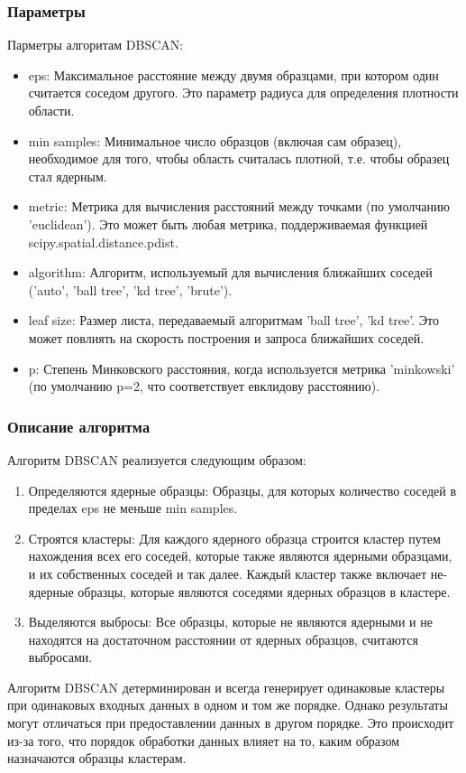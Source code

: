 		\subsubsection{Параметры}
			Парметры алгоритам DBSCAN:
			\begin{itemize}
				\item eps: Максимальное расстояние между двумя образцами, при котором один считается соседом другого. Это параметр радиуса для определения плотности области.
				\item min samples: Минимальное число образцов (включая сам образец), необходимое для того, чтобы область считалась плотной, т.е. чтобы образец стал ядерным.
				\item metric: Метрика для вычисления расстояний между точками (по умолчанию 'euclidean'). Это может быть любая метрика, поддерживаемая функцией scipy.spatial.distance.pdist.
				\item algorithm: Алгоритм, используемый для вычисления ближайших соседей ('auto', 'ball tree', 'kd tree', 'brute').
				\item leaf size: Размер листа, передаваемый алгоритмам 'ball tree', 'kd tree'. Это может повлиять на скорость построения и запроса ближайших соседей.
				\item p: Степень Минковского расстояния, когда используется метрика 'minkowski' (по умолчанию p=2, что соответствует евклидову расстоянию).	
			\end{itemize}
			
			
		\subsubsection{Описание алгоритма}
			Алгоритм DBSCAN реализуется следующим образом:
			\begin{enumerate}
				\item Определяются ядерные образцы: Образцы, для которых количество соседей в пределах eps не меньше min samples.
				\item Строятся кластеры: Для каждого ядерного образца строится кластер путем нахождения всех его соседей, которые также являются ядерными образцами, и их собственных соседей и так далее. Каждый кластер также включает не-ядерные образцы, которые являются соседями ядерных образцов в кластере.
				\item Выделяются выбросы: Все образцы, которые не являются ядерными и не находятся на достаточном расстоянии от ядерных образцов, считаются выбросами.
			\end{enumerate}
			Алгоритм DBSCAN детерминирован и всегда генерирует одинаковые кластеры при одинаковых входных данных в одном и том же порядке. Однако результаты могут отличаться при предоставлении данных в другом порядке. Это происходит из-за того, что порядок обработки данных влияет на то, каким образом назначаются образцы кластерам.
			
